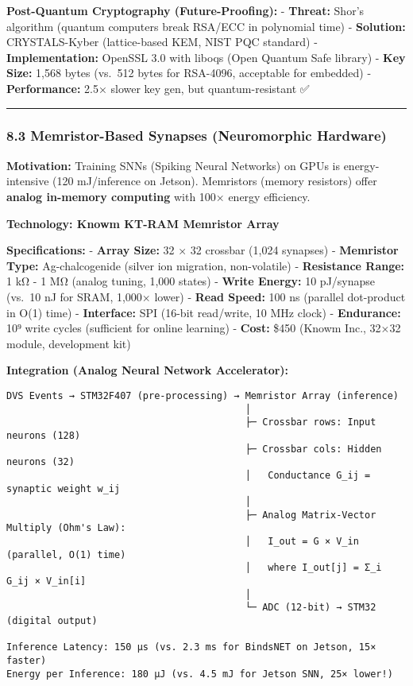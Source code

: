 \documentclass[
]{article}
\begin{document}
\textbf{Post-Quantum Cryptography (Future-Proofing):} - \textbf{Threat:}
Shor's algorithm (quantum computers break RSA/ECC in polynomial time) -
\textbf{Solution:} CRYSTALS-Kyber (lattice-based KEM, NIST PQC standard)
- \textbf{Implementation:} OpenSSL 3.0 with liboqs (Open Quantum Safe
library) - \textbf{Key Size:} 1,568 bytes (vs.~512 bytes for RSA-4096,
acceptable for embedded) - \textbf{Performance:} 2.5× slower key gen,
but quantum-resistant ✅

\begin{center}\rule{0.5\linewidth}{0.5pt}\end{center}

\hypertarget{memristor-based-synapses-neuromorphic-hardware}{%
\subsubsection{8.3 Memristor-Based Synapses (Neuromorphic
Hardware)}\label{memristor-based-synapses-neuromorphic-hardware}}

\textbf{Motivation:} Training SNNs (Spiking Neural Networks) on GPUs is
energy-intensive (120 mJ/inference on Jetson). Memristors (memory
resistors) offer \textbf{analog in-memory computing} with 100× energy
efficiency.

\textbf{Technology: Knowm KT-RAM Memristor Array}

\textbf{Specifications:} - \textbf{Array Size:} 32 × 32 crossbar (1,024
synapses) - \textbf{Memristor Type:} Ag-chalcogenide (silver ion
migration, non-volatile) - \textbf{Resistance Range:} 1 kΩ - 1 MΩ
(analog tuning, 1,000 states) - \textbf{Write Energy:} 10 pJ/synapse
(vs.~10 nJ for SRAM, 1,000× lower) - \textbf{Read Speed:} 100 ns
(parallel dot-product in O(1) time) - \textbf{Interface:} SPI (16-bit
read/write, 10 MHz clock) - \textbf{Endurance:} 10⁹ write cycles
(sufficient for online learning) - \textbf{Cost:} \$450 (Knowm Inc.,
32×32 module, development kit)

\textbf{Integration (Analog Neural Network Accelerator):}

\begin{verbatim}
DVS Events → STM32F407 (pre-processing) → Memristor Array (inference)
                                          │
                                          ├─ Crossbar rows: Input neurons (128)
                                          ├─ Crossbar cols: Hidden neurons (32)
                                          │   Conductance G_ij = synaptic weight w_ij
                                          │
                                          ├─ Analog Matrix-Vector Multiply (Ohm's Law):
                                          │   I_out = G × V_in (parallel, O(1) time)
                                          │   where I_out[j] = Σ_i G_ij × V_in[i]
                                          │
                                          └─ ADC (12-bit) → STM32 (digital output)

Inference Latency: 150 μs (vs. 2.3 ms for BindsNET on Jetson, 15× faster)
Energy per Inference: 180 μJ (vs. 4.5 mJ for Jetson SNN, 25× lower!)
\end{verbatim}
\end{document}
